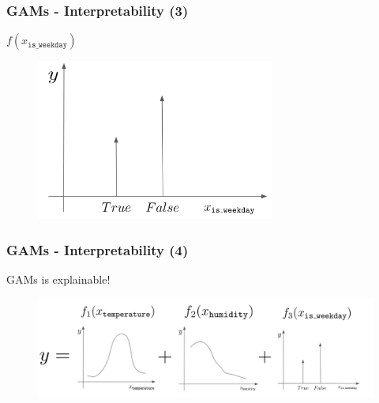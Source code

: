 \documentclass{beamer}
\begin{document}
\begin{frame}
  \frametitle{GAMs - Interpretability (3)}

  $f(x_{\mathtt{is\_weekday}})$

  \noindent\makebox[\linewidth]{\rule{\paperwidth}{0.4pt}}

  \begin{figure}[ht]
    \centering
    \includegraphics[width=0.7\textwidth]{./figures/gam_is_weekday.jpg}
  \end{figure}

\end{frame}

\begin{frame}
  \frametitle{GAMs - Interpretability (4)}

  GAMs is explainable!

  \noindent\makebox[\linewidth]{\rule{\paperwidth}{0.4pt}}

  \begin{figure}[ht]
    \centering
    \includegraphics[width=1\textwidth]{./figures/gam.png}
  \end{figure}

\end{frame}
\end{document}
